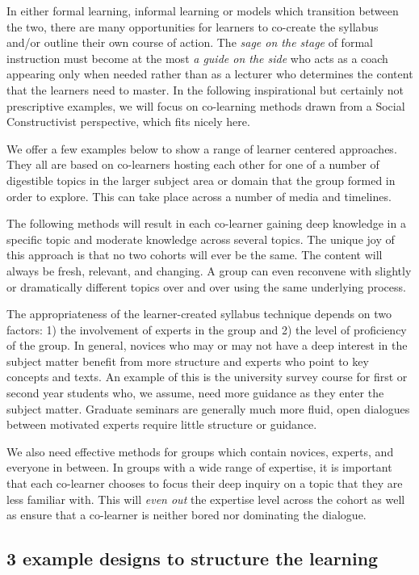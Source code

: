 In either formal learning, informal learning or models which transition
between the two, there are many opportunities for learners to co-create
the syllabus and/or outline their own course of action. The \emph{sage
on the stage} of formal instruction must become at the most \emph{a
guide on the side} who acts as a coach appearing only when needed rather
than as a lecturer who determines the content that the learners need to
master. In the following inspirational but certainly not prescriptive
examples, we will focus on co-learning methods drawn from a Social
Constructivist perspective, which fits nicely here.

We offer a few examples below to show a range of learner centered
approaches. They all are based on co-learners hosting each other for one
of a number of digestible topics in the larger subject area or domain
that the group formed in order to explore. This can take place across a
number of media and timelines.

The following methods will result in each co-learner gaining deep
knowledge in a specific topic and moderate knowledge across several
topics. The unique joy of this approach is that no two cohorts will ever
be the same. The content will always be fresh, relevant, and changing. A
group can even reconvene with slightly or dramatically different topics
over and over using the same underlying process.

The appropriateness of the learner-created syllabus technique depends on
two factors: 1) the involvement of experts in the group and 2) the level
of proficiency of the group. In general, novices who may or may not have
a deep interest in the subject matter benefit from more structure and
experts who point to key concepts and texts. An example of this is the
university survey course for first or second year students who, we
assume, need more guidance as they enter the subject matter. Graduate
seminars are generally much more fluid, open dialogues between motivated
experts require little structure or guidance.

We also need effective methods for groups which contain novices,
experts, and everyone in between. In groups with a wide range of
expertise, it is important that each co-learner chooses to focus their
deep inquiry on a topic that they are less familiar with. This will
\emph{even out} the expertise level across the cohort as well as ensure
that a co-learner is neither bored nor dominating the dialogue.

\subsection{3 example designs to structure the
learning}\label{example-designs-to-structure-the-learning}

